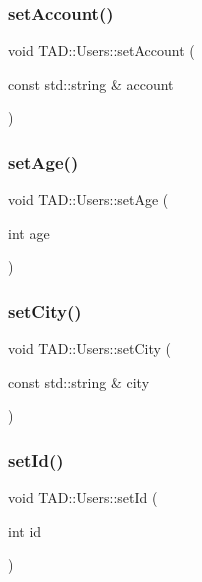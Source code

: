 \subsubsection{\texorpdfstring{set\+Account()}{setAccount()}}
{\footnotesize\ttfamily void T\+A\+D\+::\+Users\+::set\+Account (\begin{DoxyParamCaption}\item[{const std\+::string \&}]{account }\end{DoxyParamCaption})}

\mbox{\label{class_t_a_d_1_1_users_a0ee5c6fbfaa0682443749cacecdd0289}} 
\subsubsection{\texorpdfstring{set\+Age()}{setAge()}}
{\footnotesize\ttfamily void T\+A\+D\+::\+Users\+::set\+Age (\begin{DoxyParamCaption}\item[{int}]{age }\end{DoxyParamCaption})}

\mbox{\label{class_t_a_d_1_1_users_a1a11d3c4f4a76b389027434f3e2f17cc}} 
\subsubsection{\texorpdfstring{set\+City()}{setCity()}}
{\footnotesize\ttfamily void T\+A\+D\+::\+Users\+::set\+City (\begin{DoxyParamCaption}\item[{const std\+::string \&}]{city }\end{DoxyParamCaption})}

\mbox{\label{class_t_a_d_1_1_users_a3a81db57c1cebbfc0133d249088ebd2d}} 
\subsubsection{\texorpdfstring{set\+Id()}{setId()}}
{\footnotesize\ttfamily void T\+A\+D\+::\+Users\+::set\+Id (\begin{DoxyParamCaption}\item[{int}]{id }\end{DoxyParamCaption})}

